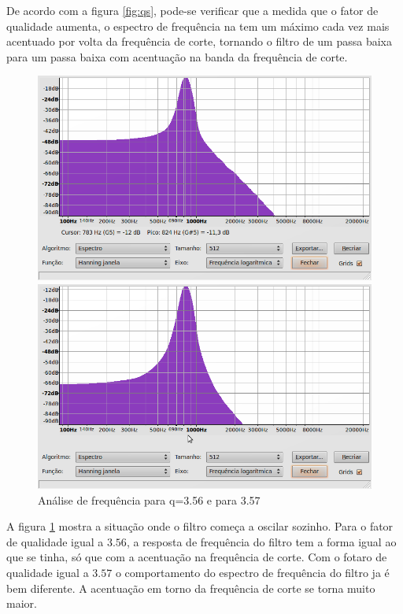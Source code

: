 \documentclass{article}
\begin{document}
De acordo com a figura \ref{fig:qs}, pode-se verificar que a medida que o fator de qualidade aumenta, o espectro de frequência na tem um
 máximo cada vez mais acentuado por volta da frequência de corte, tornando o filtro de um passa baixa para um passa baixa com acentuação na 
banda da frequência de corte.



\begin{figure}
  \centering
\parbox{2in}{
    \centering
    \includegraphics[scale=0.2]{q356.png}
    }%
\qquad	  
\parbox{2in}{
      \centering
      \includegraphics[scale=0.2]{q357.png}
      }%

  \caption{Análise de frequência para q=3.56 e para 3.57}
  \label{fig:qs2}
\end{figure}


A figura \ref{fig:qs2} mostra a situação onde o filtro começa a oscilar sozinho. Para o fator de qualidade igual a $3.56$, a resposta de frequência
do filtro tem a forma igual ao que se tinha, só que com a acentuação na frequência de corte. Com o fotaro de qualidade igual a $3.57$ o comportamento 
do espectro de frequência  do filtro ja é bem diferente. A acentuação em torno da frequência de corte se torna muito maior. 
\end{document}
